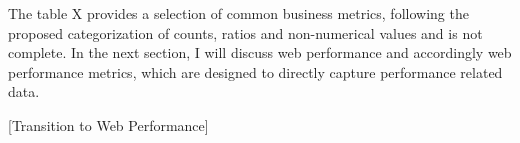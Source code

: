 












The table X provides a selection of common business metrics, following the proposed categorization of counts, ratios and non-numerical values and is not complete.
In the next section, I will discuss web performance and accordingly web performance metrics, which are designed to directly capture performance related data.



[Transition to Web Performance]
















 
 

